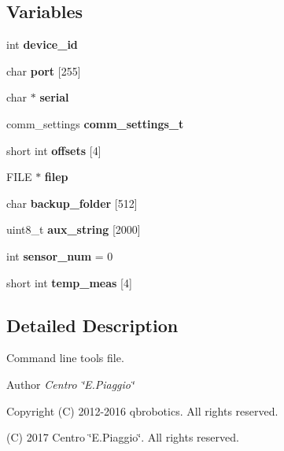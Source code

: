 \subsection*{Variables}
\begin{DoxyCompactItemize}
\item 
\mbox{\label{qbmove__backup_8c_accfd0301c469314772cc651ec198d492}} 
int {\bfseries device\+\_\+id}
\item 
\mbox{\label{qbmove__backup_8c_a5731872dfb5c314591bb61e35965e6cf}} 
char {\bfseries port} [255]
\item 
\mbox{\label{qbmove__backup_8c_ac04a6014404850aed62b804baff0748d}} 
char $\ast$ {\bfseries serial}
\item 
\mbox{\label{qbmove__backup_8c_a92153f4b70cd8ba4e9b502ccff8d28bf}} 
comm\+\_\+settings {\bfseries comm\+\_\+settings\+\_\+t}
\item 
\mbox{\label{qbmove__backup_8c_ac4e537e89adb6a44540bfef08b05d830}} 
short int {\bfseries offsets} [4]
\item 
\mbox{\label{qbmove__backup_8c_a2937a41bde0307e87626b85452766f89}} 
F\+I\+LE $\ast$ {\bfseries filep}
\item 
\mbox{\label{qbmove__backup_8c_ab0f61beb42e398815e77fd178651e333}} 
char {\bfseries backup\+\_\+folder} [512]
\item 
\mbox{\label{qbmove__backup_8c_a6fb6cb9ef16365b3861e2a813ad20037}} 
uint8\+\_\+t {\bfseries aux\+\_\+string} [2000]
\item 
\mbox{\label{qbmove__backup_8c_a088e92720e16f558a03834f4f43495a3}} 
int {\bfseries sensor\+\_\+num} = 0
\item 
\mbox{\label{qbmove__backup_8c_a390d0e64ffcfcf74f04fb0c4ee62970c}} 
short int {\bfseries temp\+\_\+meas} [4]
\end{DoxyCompactItemize}


\subsection{Detailed Description}
Command line tools file. 

\begin{DoxyAuthor}{Author}
{\itshape Centro \char`\"{}\+E.\+Piaggio\char`\"{}} 
\end{DoxyAuthor}
\begin{DoxyCopyright}{Copyright}
(C) 2012-\/2016 qbrobotics. All rights reserved. 

(C) 2017 Centro \char`\"{}\+E.\+Piaggio\char`\"{}. All rights reserved. 
\end{DoxyCopyright}
